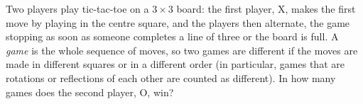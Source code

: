 Two players play tic-tac-toe on a $3\times3$ board: the first player, X, makes the first move by playing in the centre square, and the players then alternate, the game stopping as soon as someone completes a line of three or the board is full. A \emph{game} is the whole sequence of moves, so two games are different if the moves are made in different squares or in a different order (in particular, games that are rotations or reflections of each other are counted as different). In how many games does the second player, O, win?
